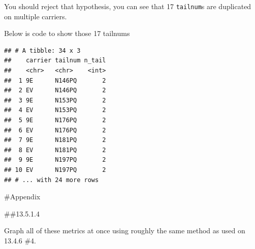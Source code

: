 \documentclass[]{book}
\newenvironment{Shaded}{\begin{snugshade}}{\end{snugshade}}
\newcommand{\DataTypeTok}[1]{\textcolor[rgb]{0.13,0.29,0.53}{#1}}
\newcommand{\DecValTok}[1]{\textcolor[rgb]{0.00,0.00,0.81}{#1}}
\newcommand{\KeywordTok}[1]{\textcolor[rgb]{0.13,0.29,0.53}{\textbf{#1}}}
\newcommand{\NormalTok}[1]{#1}
\newcommand{\OperatorTok}[1]{\textcolor[rgb]{0.81,0.36,0.00}{\textbf{#1}}}
\newcommand{\StringTok}[1]{\textcolor[rgb]{0.31,0.60,0.02}{#1}}
\theoremstyle{definition}
\theoremstyle{definition}
\theoremstyle{definition}
\theoremstyle{remark}
\begin{document}
\begin{enumerate}
  You should reject that hypothesis, you can see that 17
  \texttt{tailnum}s are duplicated on multiple carriers.

  Below is code to show those 17 tailnums

\begin{Shaded}
\end{Shaded}

\begin{verbatim}
## # A tibble: 34 x 3
##    carrier tailnum n_tail
##    <chr>   <chr>    <int>
##  1 9E      N146PQ       2
##  2 EV      N146PQ       2
##  3 9E      N153PQ       2
##  4 EV      N153PQ       2
##  5 9E      N176PQ       2
##  6 EV      N176PQ       2
##  7 9E      N181PQ       2
##  8 EV      N181PQ       2
##  9 9E      N197PQ       2
## 10 EV      N197PQ       2
## # ... with 24 more rows
\end{verbatim}
\end{enumerate}

\#Appendix

\#\#13.5.1.4

Graph all of these metrics at once using roughly the same method as used
on 13.4.6 \#4.
\end{document}
